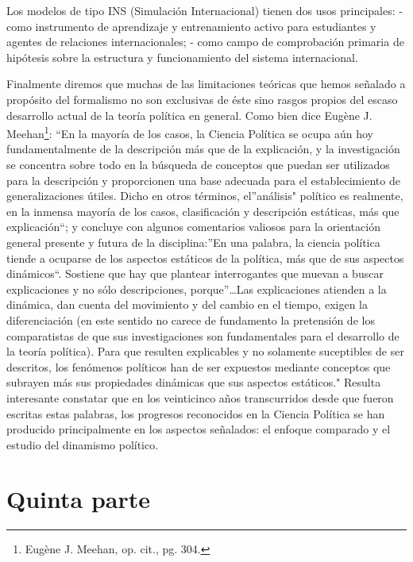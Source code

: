 \documentclass[
]{book}
\begin{document}
Los modelos de tipo INS (Simulación Internacional) tienen dos usos principales: - como instrumento de aprendizaje y entrenamiento activo para estudiantes y agentes de relaciones internacionales; - como campo de comprobación primaria de hipótesis sobre la estructura y funcionamiento del sistema internacional.

Finalmente diremos que muchas de las limitaciones teóricas que hemos señalado a propósito del formalismo no son exclusivas de éste sino rasgos propios del escaso desarrollo actual de la teoría política en general. Como bien dice Eugène J. Meehan\footnote{Eugène J. Meehan, op. cit., pg. 304.}: ``En la mayoría de los casos, la Ciencia Política se ocupa aún hoy fundamentalmente de la descripción más que de la explicación, y la investigación se concentra sobre todo en la búsqueda de conceptos que puedan ser utilizados para la descripción y proporcionen una base adecuada para el establecimiento de generalizaciones útiles. Dicho en otros términos, el''análisis" político es realmente, en la inmensa mayoría de los casos, clasificación y descripción estáticas, más que explicación``; y concluye con algunos comentarios valiosos para la orientación general presente y futura de la disciplina:''En una palabra, la ciencia política tiende a ocuparse de los aspectos estáticos de la política, más que de sus aspectos dinámicos``. Sostiene que hay que plantear interrogantes que muevan a buscar explicaciones y no sólo descripciones, porque''\ldots Las explicaciones atienden a la dinámica, dan cuenta del movimiento y del cambio en el tiempo, exigen la diferenciación (en este sentido no carece de fundamento la pretensión de los comparatistas de que sus investigaciones son fundamentales para el desarrollo de la teoría política). Para que resulten explicables y no solamente suceptibles de ser descritos, los fenómenos políticos han de ser expuestos mediante conceptos que subrayen más sus propiedades dinámicas que sus aspectos estáticos." Resulta interesante constatar que en los veinticinco años transcurridos desde que fueron escritas estas palabras, los progresos reconocidos en la Ciencia Política se han producido principalmente en los aspectos señalados: el enfoque comparado y el estudio del dinamismo político.

\hypertarget{quinta-parte}{%
\section*{Quinta parte}\label{quinta-parte}}
\end{document}
